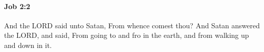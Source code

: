 
		\paragraph{Job 2:2} %
			\label{JOB-2-2}

			And the LORD said unto Satan, From whence comest thou? And Satan answered the LORD, and said, From going to and fro in the earth, and from walking up and down in it.


